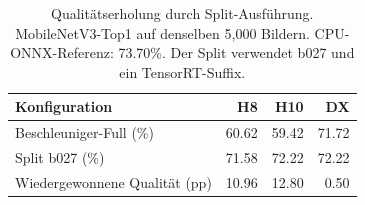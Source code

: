 \begin{table}[t]
\caption{Qualitätserholung durch Split-Ausführung. MobileNetV3-Top1 auf denselben 5,000 Bildern. CPU-ONNX-Referenz: 73.70\%. Der Split verwendet b027 und ein TensorRT-Suffix.}
\label{tab:vendor-quality}
\centering\small
\begin{tabular}{lrrr}
\toprule
Konfiguration & H8 & H10 & DX\\
\midrule
Beschleuniger-Full (\%) & 60.62 & 59.42 & 71.72\\
Split b027 (\%) & 71.58 & 72.22 & 72.22\\
Wiedergewonnene Qualität (pp) & 10.96 & 12.80 & 0.50\\
\bottomrule
\end{tabular}
\end{table}
